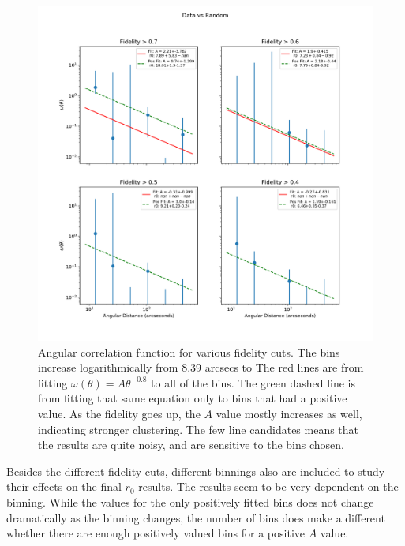 \begin{figure}[tbp]
\centering \includegraphics[width=120mm]{clustering/Log_4Panel_Data_Vs_Random_bin6_NFalse_Num10000.png}
\caption{Angular correlation function for various fidelity cuts. The bins increase logarithmically from 8.39 arcsecs to  The red lines are from fitting $\omega(\theta) = A\theta^{-0.8} $ to all of the bins. The green dashed line is from fitting that same equation only to bins that had a positive value. As the fidelity goes up, the $A$ value mostly increases as well, indicating stronger clustering. The few line candidates means that the results are quite noisy, and are sensitive to the bins chosen.}
\label{fig:Angular_correlation}
\end{figure}

Besides the different fidelity cuts, different binnings also are included to study their effects on the final $r_0$ results. The results seem to be very dependent on the binning. While the values for the only positively fitted bins does not change dramatically as the binning changes, the number of bins does make a different whether there are enough positively valued bins for a positive $A$ value.

